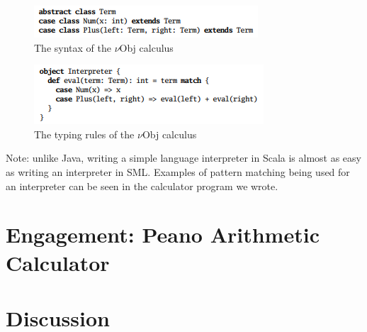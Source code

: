 \documentclass[jou,apacite]{IEEEtran}
\begin{document}
  \begin{figure}[h]
    \centering
    \includegraphics[width=\columnwidth]{fig4.png}
    \caption{The syntax of the $\nu$Obj calculus}
    \label{fig:example}
  \end{figure}

  \begin{figure}[h]
    \centering
    \includegraphics[width=\columnwidth]{fig5.png}
    \caption{The typing rules of the $\nu$Obj calculus}
    \label{fig:example}
  \end{figure}
Note: unlike Java, writing a simple language interpreter in Scala is almost as easy as writing an interpreter in SML. Examples of pattern matching being used for an interpreter can be seen in the calculator program we wrote.








\section{Engagement: Peano Arithmetic Calculator}
\label{sec:engag-peano-arithm}

\section{Discussion}
\label{sec:discussion}
\end{document}
